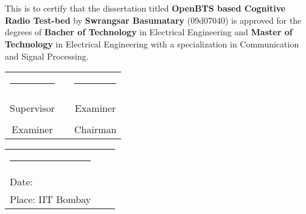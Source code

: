 \chapter*{}
\thispagestyle{empty}

This is to certify that the dissertation titled \textbf{OpenBTS based 
Cognitive Radio Test-bed} by \textbf{Swrangsar Basumatary} (09d07040) is
approved for the degrees of \textbf{Bacher of Technology} in Electrical
Engineering and \textbf{Master of Technology} in Electrical Engineering with
a specialization in Communication and Signal Processing.

\vspace{2.5cm}

\begin{center}
\begin{tabular}{ccc}
\rule{60mm}{0pt}        & \rule{10mm}{0pt}       & \rule{60mm}{0pt} \\
\dotfill                &                        & \dotfill \\
Supervisor              &                        & Examiner \vspace{2cm} \\
\dotfill                &                        & \dotfill \\
Examiner       &                        & Chairman \vspace{2cm} \\
\end{tabular}    
\end{center}

\vspace{5mm}
\begin{tabular}{lll}
\rule{40mm}{0pt}        & \rule{50mm}{0pt}       & \rule{60mm}{0pt} \\
Date:\dotfill           &                        & \\
Place: IIT Bombay       &                        & \\
\end{tabular}
